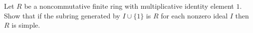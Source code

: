Let $R$ be a noncommutative finite ring with multiplicative identity element $1$. Show that if the subring generated by $I \cup \{1\}$ is $R$ for each nonzero ideal $I$ then $R$ is simple.